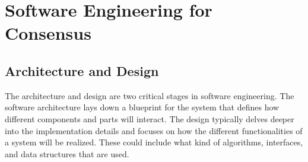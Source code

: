 \documentclass[11pt]{article}
\begin{document}
\section{Software Engineering for Consensus}
\subsection{Architecture and Design}
The architecture and design are two critical stages in software engineering. The software architecture lays down a blueprint for the system that defines how different components and parts will interact. The design typically delves deeper into the implementation details and focuses on how the different functionalities of a system will be realized. These could include what kind of algorithms, interfaces, and data structures that are used. 
\end{document}
